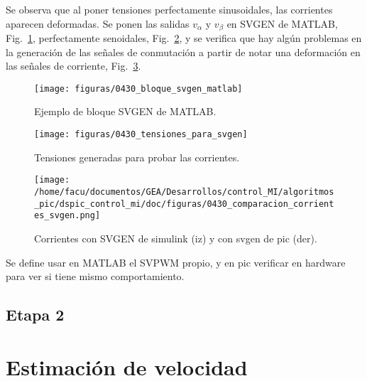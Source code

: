 \documentclass{article}
\begin{document}
			Se observa que al poner tensiones perfectamente sinusoidales, las corrientes aparecen deformadas. Se ponen las salidas $v_\alpha$ y $v_\beta$ en SVGEN de MATLAB, Fig.~\ref{fig:bloque_svgen_matlab}, perfectamente senoidales, Fig.~\ref{fig:tensiones_para_svgen},  y se verifica que hay algún problemas en la generación de las señales de conmutación a partir de notar una deformación en las señales de corriente, Fig.~\ref{fig:comparacion_corrientes}.
		
			\begin{figure}
				\centering
				\texttt{[image: figuras/0430\_bloque\_svgen\_matlab]}
				\caption[]{Ejemplo de bloque SVGEN de MATLAB.}
				\label{fig:bloque_svgen_matlab}
			\end{figure}
			
			\begin{figure}
				\centering
				\texttt{[image: figuras/0430\_tensiones\_para\_svgen]}
				\caption[]{Tensiones generadas para probar las corrientes.}
				\label{fig:tensiones_para_svgen}
			\end{figure}
		
			
			\begin{figure}[h]
			\begin{center}
				\texttt{[image: /home/facu/documentos/GEA/Desarrollos/control\_MI/algoritmos\_pic/dspic\_control\_mi/doc/figuras/0430\_comparacion\_corrientes\_svgen.png]} %
				\caption{Corrientes con SVGEN de simulink (iz) y con svgen de pic (der).}
				\label{fig:comparacion_corrientes}
			\end{center}
			\end{figure}
		
			Se define usar en MATLAB el SVPWM propio, y en pic verificar en hardware para ver si tiene mismo comportamiento.
	
		\subsection{Etapa 2}
	

	
	\section{Estimación de velocidad}	
		
\end{document}
